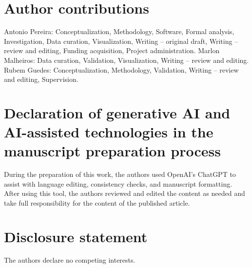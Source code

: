 \documentclass[12pt]{article}
\begin{document}
\section*{Author contributions}
Antonio Pereira: Conceptualization, Methodology, Software, Formal analysis, Investigation, Data curation, Visualization, Writing -- original draft, Writing -- review and editing, Funding acquisition, Project administration. Marlon Malheiros: Data curation, Validation, Visualization, Writing -- review and editing. Rubem Guedes: Conceptualization, Methodology, Validation, Writing -- review and editing, Supervision.

\section*{Declaration of generative AI and AI-assisted technologies in the manuscript preparation process}
During the preparation of this work, the authors used OpenAI's ChatGPT to assist with language editing, consistency checks, and manuscript formatting. After using this tool, the authors reviewed and edited the content as needed and take full responsibility for the content of the published article.

\section*{Disclosure statement}
The authors declare no competing interests.



\end{document}
